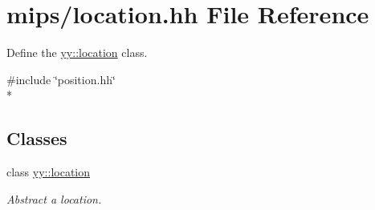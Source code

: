 \hypertarget{location_8hh}{\section{mips/location.hh File Reference}
\label{location_8hh}
}


Define the \hyperlink{classyy_1_1location}{yy\-::location} class.  


{\ttfamily \#include \char`\"{}position.\-hh\char`\"{}}\\*
\subsection*{Classes}
\begin{DoxyCompactItemize}
\item 
class \hyperlink{classyy_1_1location}{yy\-::location}
\begin{DoxyCompactList}\small\item\em Abstract a location. \end{DoxyCompactList}\end{DoxyCompactItemize}
